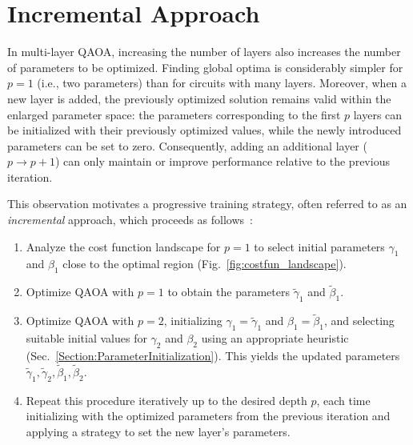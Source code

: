\section{Incremental Approach}
\label{Section:IncrementalApproach}

In multi-layer QAOA, increasing the number of layers also increases the number of parameters to be optimized. Finding global optima is considerably simpler for $p=1$ (i.e., two parameters) than for circuits with many layers. Moreover, when a new layer is added, the previously optimized solution remains valid within the enlarged parameter space: the parameters corresponding to the first $p$ layers can be initialized with their previously optimized values, while the newly introduced parameters can be set to zero. Consequently, adding an additional layer ($p \rightarrow p+1$) can only maintain or improve performance relative to the previous iteration.

This observation motivates a progressive training strategy, often referred to as an \emph{incremental} approach, which proceeds as follows~\cite{zhou_quantum_2020}:
\begin{enumerate}
    \item Analyze the cost function landscape for $p=1$ to select initial parameters 
    $\gamma_1$ and $\beta_1$ close to the optimal region (Fig.~\ref{fig:costfun_landscape}).
    \item Optimize QAOA with $p=1$ to obtain the parameters 
    $\widetilde{\gamma}_1$ and $\widetilde{\beta}_1$.
    \item Optimize QAOA with $p=2$, initializing 
    $\gamma_1=\widetilde{\gamma}_1$ and $\beta_1=\widetilde{\beta}_1$, 
    and selecting suitable initial values for $\gamma_2$ and $\beta_2$ using an appropriate
    heuristic (Sec.~\ref{Section:ParameterInitialization}). This yields the updated parameters 
    $\widetilde{\gamma}_1, \widetilde{\gamma}_2, \widetilde{\beta}_1, \widetilde{\beta}_2$.
    \item Repeat this procedure iteratively up to the desired depth $p$, each time initializing
    with the optimized parameters from the previous iteration and applying a strategy to set
    the new layer's parameters.
\end{enumerate}

